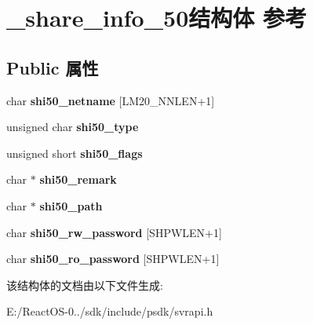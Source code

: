 \hypertarget{struct__share__info__50}{}\section{\+\_\+share\+\_\+info\+\_\+50结构体 参考}
\label{struct__share__info__50}
\subsection*{Public 属性}
\begin{DoxyCompactItemize}
\item 
\mbox{\label{struct__share__info__50_a0fc6a6ba896722a633095eab3b5013cc}} 
char {\bfseries shi50\+\_\+netname} \mbox{[}L\+M20\+\_\+\+N\+N\+L\+EN+1\mbox{]}
\item 
\mbox{\label{struct__share__info__50_aa013aec079e3a72e342ebc774e54f8db}} 
unsigned char {\bfseries shi50\+\_\+type}
\item 
\mbox{\label{struct__share__info__50_a4252d17fe63b8ff5b6832754fff30793}} 
unsigned short {\bfseries shi50\+\_\+flags}
\item 
\mbox{\label{struct__share__info__50_a39011dc01a5d8afc189acbf23e9d7735}} 
char $\ast$ {\bfseries shi50\+\_\+remark}
\item 
\mbox{\label{struct__share__info__50_a77bfbbb35b22ff5ee3b581acacd35c6f}} 
char $\ast$ {\bfseries shi50\+\_\+path}
\item 
\mbox{\label{struct__share__info__50_a1aede311309bed2ead30470a0b9919bf}} 
char {\bfseries shi50\+\_\+rw\+\_\+password} \mbox{[}S\+H\+P\+W\+L\+EN+1\mbox{]}
\item 
\mbox{\label{struct__share__info__50_a77baeadcc2640a4ba701454e468452f3}} 
char {\bfseries shi50\+\_\+ro\+\_\+password} \mbox{[}S\+H\+P\+W\+L\+EN+1\mbox{]}
\end{DoxyCompactItemize}


该结构体的文档由以下文件生成\+:\begin{DoxyCompactItemize}
\item 
E\+:/\+React\+O\+S-\/0../sdk/include/psdk/svrapi.\+h\end{DoxyCompactItemize}
